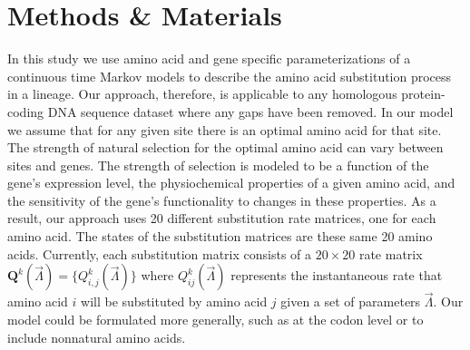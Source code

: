 \documentclass[13pt]{article}
\newcommand{\Qmat}{\ensuremath{\mathbf{Q}}\xspace}
\begin{document}
\section{Methods \& Materials}
In this study we use amino acid and gene specific parameterizations of a continuous time Markov models to describe the amino acid substitution process in a lineage.
Our approach, therefore, is applicable to any homologous protein-coding DNA sequence dataset where any gaps have been removed.
In our model we assume that for any given site there is an optimal amino acid for that site.
The strength of natural selection for the optimal amino acid can vary between sites and genes.
The strength of selection is modeled to be a function of the gene's expression level, the physiochemical properties of a given amino acid, and the sensitivity of the gene's functionality to changes in these properties.
As a result, our approach uses 20 different substitution rate matrices, one for each amino acid. 
The states of the substitution matrices are these same 20 amino acids.
Currently, each substitution matrix consists of a  $20 \times 20$ rate matrix $\Qmat^k(\vec{\Lambda})=\{Q^k_{i,j}(\vec{\Lambda})\}$ where $Q^k_{ij}(\vec{\Lambda})$ represents the instantaneous rate that amino acid $i$ will be substituted by amino acid $j$ given a set of parameters $\vec{\Lambda}$.
Our model could be formulated more generally, such as at the codon level or to include nonnatural amino acids.
\end{document}
